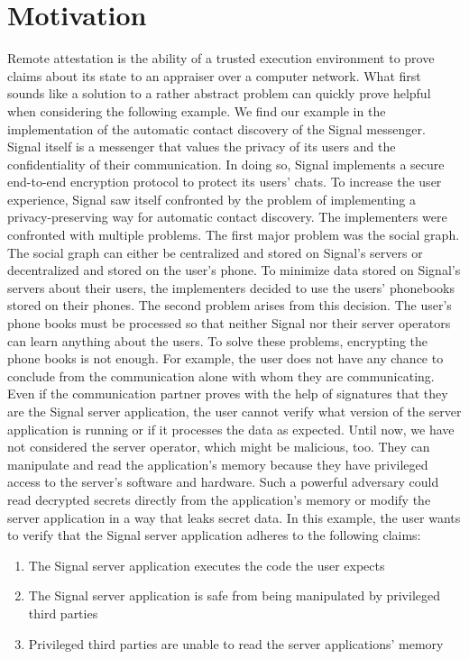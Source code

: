 \section{Motivation}
\label{sec:10:motivation}
Remote attestation is the ability of a trusted execution environment to prove
claims about its state to an appraiser over a computer network.
\cite{coker_principles_2011} What first sounds like a solution to a rather
abstract problem can quickly prove helpful when considering the following
example. We find our example in the implementation of the automatic contact
discovery of the Signal messenger. Signal itself is a messenger that values the
privacy of its users and the confidentiality of their communication. In doing
so, Signal implements a secure end-to-end encryption protocol to protect its
users' chats.\cite{cohn2020formal} To increase the user experience, Signal saw
itself confronted by the problem of implementing a privacy-preserving way for
automatic contact discovery.\cite{SignalCd} The implementers were confronted
with multiple problems. The first major problem was the social graph. The social
graph can either be centralized and stored on Signal's servers or decentralized
and stored on the user's phone. To minimize data stored on Signal's servers
about their users, the implementers decided to use the users' phonebooks stored
on their phones. The second problem arises from this decision. The user's phone
books must be processed so that neither Signal nor their server operators can
learn anything about the users. To solve these problems, encrypting the phone
books is not enough. For example, the user does not have any chance to conclude
from the communication alone with whom they are communicating. Even if the
communication partner proves with the help of signatures that they are the
Signal server application, the user cannot verify what version of the server
application is running or if it processes the data as expected. Until now, we
have not considered the server operator, which might be malicious, too. They can
manipulate and read the application's memory because they have privileged access
to the server's software and hardware. Such a powerful adversary could read
decrypted secrets directly from the application's memory or modify the server
application in a way that leaks secret data. In this example, the user wants to
verify that the Signal server application adheres to the following claims:
\begin{enumerate}
    \item The Signal server application executes the code the user expects
    \item The Signal server application is safe from being manipulated by
          privileged third parties
    \item Privileged third parties are unable to read the server applications'
          memory
\end{enumerate}
